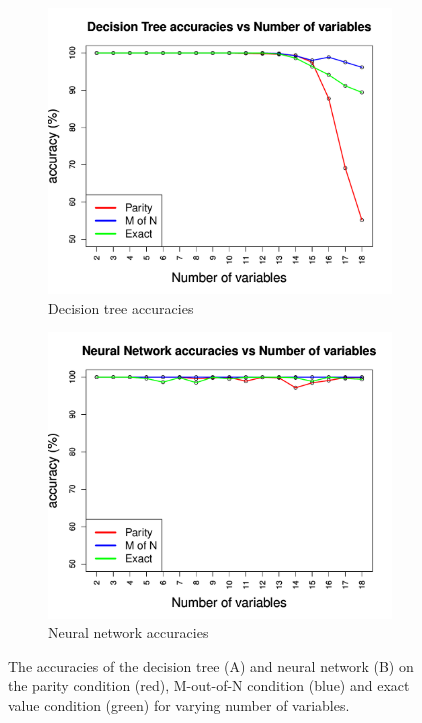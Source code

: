 \documentclass[letterpaper]{article} %
\begin{document}
 \begin{figure}[h!]
    \centering
    \begin{subfigure}[t]{0.4\textwidth}
        \centering
        \includegraphics[width = 1 \linewidth]{Figures/DTone.pdf}
        \caption{Decision tree accuracies}
        \label{fig:DTvsNN_DT}
    \end{subfigure}%
    
    
    \begin{subfigure}[t]{0.4\textwidth}
        \centering
        \includegraphics[width = 1 \linewidth]{Figures/NNone.pdf}
        \caption{Neural network accuracies}
        \label{fig:DTvsNN_NN}
    \end{subfigure}%
    \caption{The accuracies of the decision tree (A) and neural network (B) on the parity condition (red), M-out-of-N condition (blue) and exact value condition (green) for varying number of variables.}
    \label{fig:DTvsNN}
\end{figure}
\end{document}
